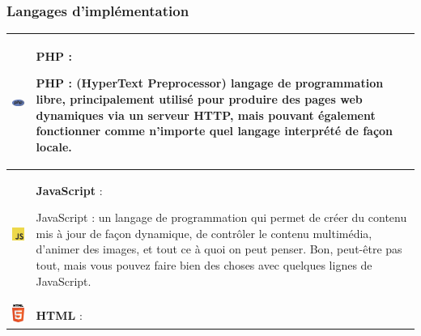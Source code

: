 \documentclass{article}
\begin{document}
            \subsubsection{Langages d'implémentation}
                \begin{table}[h!]
                    \centering
                    \begin{tabular}{|m{2cm}|m{12cm}|}
                        \hline
                        \includegraphics[width=2cm]{assets/logos/PHP_logo.png} &
                        \textbf{PHP} :
                        
                        PHP : (HyperText Preprocessor) langage de programmation libre, principalement utilisé pour produire des pages web dynamiques via un serveur HTTP, mais pouvant également fonctionner comme n'importe quel langage interprété de façon locale. \\
                        \hline
                        \includegraphics[width=2cm]{assets/logos/js.jpg} &
                        \textbf{JavaScript} :
                        
                        JavaScript : un langage de programmation qui permet de créer du contenu mis à jour de façon dynamique, de contrôler le contenu multimédia, d'animer des images, et tout ce à quoi on peut penser. Bon, peut-être pas tout, mais vous pouvez faire bien des choses avec quelques lignes de JavaScript. \\
                        \hline
                        \includegraphics[width=2cm]{assets/logos/html.jpg} &
                        \textbf{HTML} :
                        

\end{tabular}
\end{table}
\end{document}
